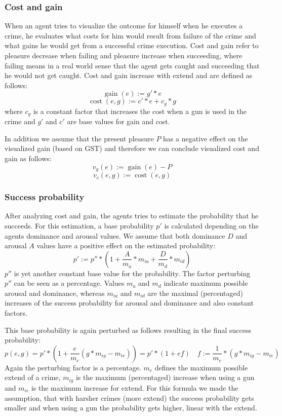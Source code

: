 \documentclass{JASSS}
\DeclareMathOperator{\cost}{cost}
\DeclareMathOperator{\gain}{gain}
\begin{document}
    \subsubsection{Cost and gain}

    When an agent tries to visualize the outcome for himself when he executes a crime, he evaluates what costs for him would result from failure of the crime and what gains he would get from a successful crime execution.
    Cost and gain refer to pleasure decrease when failing and pleasure increase when succeeding, where failing means in a real world sense that the agent gets caught and succeeding that he would not get caught.
    Cost and gain increase with extend and are defined as follows:
    $$ \gain(e) := g'*e $$ $$\cost(e, g) := c'*e + c_g*g$$
    where $c_g$ is a constant factor that increases the cost when a gun is used in the crime and $g'$ and $c'$ are base values for gain and cost.

    In addition we assume that the present pleasure $P$ has a negative effect on the visualized gain (based on GST) and therefore we can conclude visualized cost and gain as follows:
    $$ v_g(e) := \gain(e) - P $$ $$ v_c(e, g) := \cost(e, g) $$


    \subsubsection{Success probability}

    After analyzing cost and gain, the agents tries to estimate the probability that he succeeds. For this estimation, a base probability $p'$ is calculated depending on the agents dominance and arousal values.
    We assume that both dominance $D$ and arousal $A$ values have a positive effect on the estimated probability:
    $$ p' := p'' * \left(1+ \frac{A}{m_a}*m_{ia} + \frac{D}{m_d}*m_{id}\right) $$
    $p''$ is yet another constant base value for the probability. The factor perturbing $p''$ can be seen as a percentage. Values $m_a$ and $m_d$ indicate maximum possible arousal and dominance, whereas $m_{ia}$ and $m_{id}$ are the maximal (percentaged) increases of the success probability for arousal and dominance and also constant factors.

    This base probability is again perturbed as follows resulting in the final success probability:
    $$ p(e,g) = p' * \left(1 + \frac{e}{m_e}(g*m_{ig} - m_{ie})\right) = p' * (1+ef) \quad f := \frac{1}{m_e}*(g*m_{ig}-m_{ie})$$
    Again the perturbing factor is a percentage. $m_e$ defines the maximum possible extend of a crime, $m_{ig}$ is the maximum (percentaged) increase when using a gun and $m_{ie}$ is the maximum increase for extend.
    For this formula we made the assumption, that with harsher crimes (more extend) the success probability gets smaller and when using a gun the probability gets higher, linear with the extend.
\end{document}
